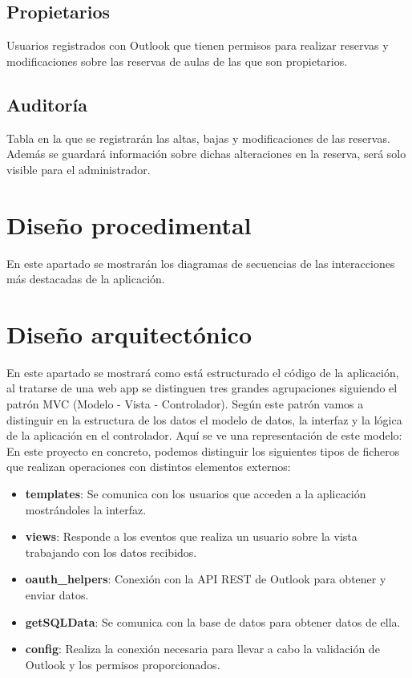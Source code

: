 \subsection{Propietarios}
Usuarios registrados con Outlook que tienen permisos para realizar reservas y modificaciones sobre las reservas de aulas de las que son propietarios.

\subsection{Auditoría}
Tabla en la que se registrarán las altas, bajas y modificaciones de las reservas. Además se guardará información sobre dichas alteraciones en la reserva, será solo visible para el administrador.

\section{Diseño procedimental}
En este apartado se mostrarán los diagramas de secuencias de las interacciones más destacadas de la aplicación.


\section{Diseño arquitectónico}
En este apartado se mostrará como está estructurado el código de la aplicación, al tratarse de una web app se distinguen tres grandes agrupaciones siguiendo el patrón MVC (Modelo - Vista - Controlador). Según este patrón vamos a distinguir en la estructura de los datos el modelo de datos, la interfaz y la lógica de la aplicación en el controlador. Aquí se ve una representación de este modelo:\newline
{}
En este proyecto en concreto, podemos distinguir los siguientes tipos de ficheros que realizan operaciones con distintos elementos externos:
\begin{itemize}
    \item \textbf{templates}: Se comunica con los usuarios que acceden a la aplicación mostrándoles la interfaz.
    \item \textbf{views}: Responde a los eventos que realiza un usuario sobre la vista trabajando con los datos recibidos.
    \item \textbf{oauth\_helpers}: Conexión con la API REST de Outlook para obtener y enviar datos.
    \item \textbf{getSQLData}: Se comunica con la base de datos para obtener datos de ella.
    \item \textbf{config}: Realiza la conexión necesaria para llevar a cabo la validación de Outlook y los permisos proporcionados.
\end{itemize}
